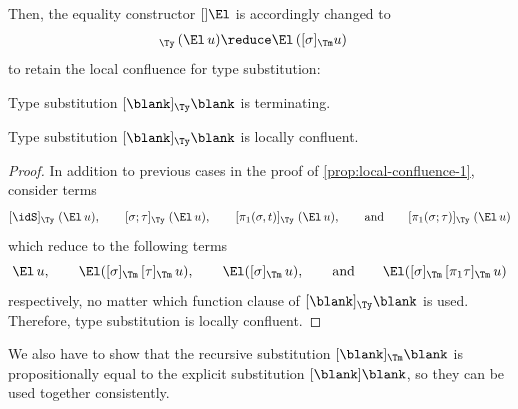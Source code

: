 \documentclass[a4paper,UKenglish,numberwithinsect,cleveref,thm-restate]{lipics-v2021}
\newcommand{\danger}{\marginpar[\hfill\dbend]{\dbend\hfill}}
\begin{document}
Then, the equality constructor $[]\El$ is accordingly changed to 
\begin{align}
  [ \sigma ]_{\Ty}\,(\El\, u) & \reduce \El\,([\sigma]_{\Tm} {u}) \label{eq:def-type-subst-7}
\end{align}
to retain the local confluence for type substitution:
\begin{proposition}[Termination]
  Type substitution $[\blank]_{\Ty}\blank$ is terminating.
  \danger
\end{proposition}
\begin{proposition} \label{prop:local-confluence-2}
  Type substitution $[\blank]_{\Ty}\blank$ is locally confluent.
  \danger
\end{proposition}
\begin{proof}
  In addition to previous cases in the proof of \cref{prop:local-confluence-1}, consider terms 
  \[
    [\idS]_{\Ty}\;(\El\,u), \qquad [\sigma;\tau]_{\Ty}\;(\El\,u), \qquad [\pi_1(\sigma, t)]_{\Ty}\;(\El\,u), \qquad\text{and}\qquad [\pi_1(\sigma; \tau)]_{\Ty}\;(\El\,u)
  \]
  which reduce to the following terms
  \[
    \El\,u, \qquad \El([\sigma]_{\Tm}\,[\tau]_{\Tm}\,u), \qquad \El([\sigma]_{\Tm}\,u), \qquad\text{and}\qquad
    \El([\sigma]_{\Tm}\,[\pi_1\tau]_{\Tm}\,u)
  \]
  respectively, no matter which function clause of $[\blank]_{\Ty}\blank$ is used.
  Therefore, type substitution is locally confluent.
\end{proof}

We also have to show that the recursive substitution $[\blank]_{\Tm}\blank$ is propositionally equal to the explicit substitution $[\blank]\blank$, so they can be used together consistently.
\end{document}
